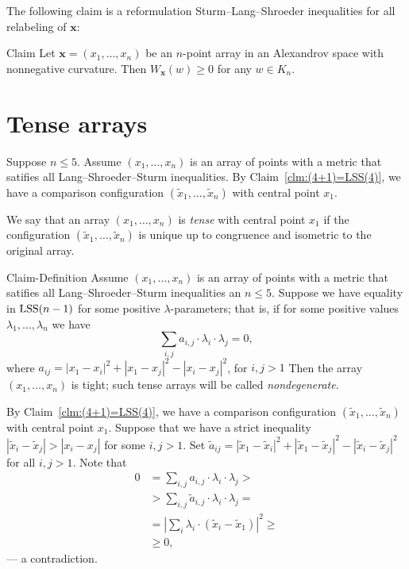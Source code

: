 \documentclass{article}
\begin{document}
The following claim is a reformulation Sturm--Lang--Shroeder inequalities for all relabeling of $\bm{x}$:

\begin{thm}{Claim}\label{clm:W(w)<0}
Let $\bm{x}=(x_1,\dots,x_n)$ be an $n$-point array in an Alexandrov space with nonnegative curvature.
Then $W_{\bm{x}}(w)\ge0$ for any $w\in K_n$.
\end{thm}

\section{Tense arrays}

Suppose $n\le 5$.
Assume $(x_1,\dots,x_n)$ is an array of points with a metric that satifies all Lang--Shroeder--Sturm inequalities.
By Claim~\ref{clm:(4+1)=LSS(4)}, we have a comparison configuration 
$(\tilde x_1,\dots,\tilde x_n)$ with central point $x_1$.

We say that an array $(x_1,\dots,x_n)$ is \emph{tense} with central point $x_1$ if the configuration $(\tilde x_1,\dots,\tilde x_n)$ is unique up to congruence and isometric to the original array.

\begin{thm}{Claim-Definition}
Assume $(x_1,\dots,x_n)$ is an array of points with a metric that satifies all Lang--Shroeder--Sturm inequalities an $n\le 5$.
Suppose we have equality in $\mathrm{LSS}(n-1)$ for some positive $\lambda$-parameters;
that is, if for some positive values $\lambda_1,\dots,\lambda_n$ we have
\[\sum_{i,j}a_{i,j}\cdot \lambda_i\cdot\lambda_j= 0,\]
where $a_{ij}=|x_1-x_i|^2+|x_1-x_j|^2-|x_i-x_j|^2$, for $i,j>1$
Then the array $(x_1,\dots,x_n)$ is tight; such tense arrays will be called \emph{nondegenerate}.
\end{thm}

By Claim~\ref{clm:(4+1)=LSS(4)}, we have a comparison configuration $(\tilde x_1,\dots,\tilde x_n)$ with central point $x_1$.
Suppose that we have a strict inequality $|\tilde x_i-\tilde x_j|>| x_i- x_j|$ for some $i,j>1$.
Set $\tilde a_{ij}=|\tilde x_1-\tilde x_i|^2+|\tilde x_1-\tilde x_j|^2-|\tilde x_i-\tilde x_j|^2$ for all $i,j>1$.
Note that 
\begin{align*}
0&=\sum_{i,j}a_{i,j}\cdot \lambda_i\cdot\lambda_j>
\\
&>\sum_{i,j}\tilde a_{i,j}\cdot \lambda_i\cdot\lambda_j= 
\\
&=\left|\sum_i\lambda_i\cdot (\tilde x_i-\tilde x_1)\right|^2\ge 
\\
&\ge0,
\end{align*}
--- a contradiction.
\qeds
\end{document}
